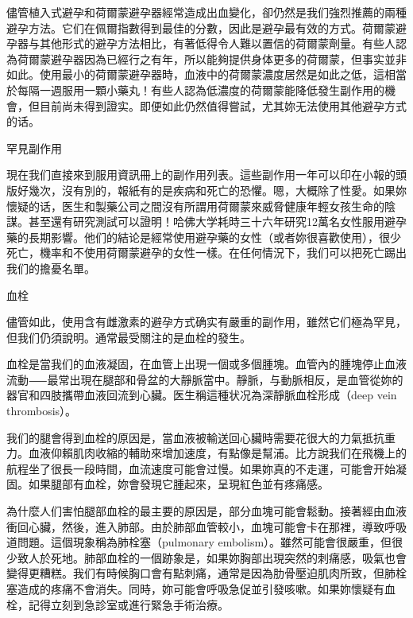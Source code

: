 \documentclass[12pt,UTF8]{ctexbook}
\begin{document}
儘管植入式避孕和荷爾蒙避孕器經常造成出血變化，卻仍然是我们強烈推薦的兩種避孕方法。它们在佩爾指數得到最佳的分數，因此是避孕最有效的方式。荷爾蒙避孕器与其他形式的避孕方法相比，有著低得令人難以置信的荷爾蒙劑量。有些人認為荷爾蒙避孕器因為已經行之有年，所以能夠提供身体更多的荷爾蒙，但事实並非如此。使用最小的荷爾蒙避孕器時，血液中的荷爾蒙濃度居然是如此之低，這相當於每隔一週服用一顆小藥丸！有些人認為低濃度的荷爾蒙能降低發生副作用的機會，但目前尚未得到證实。即便如此仍然值得嘗試，尤其妳无法使用其他避孕方式的话。





罕見副作用




現在我们直接來到服用資訊冊上的副作用列表。這些副作用一年可以印在小報的頭版好幾次，沒有別的，報紙有的是疾病和死亡的恐懼。嗯，大概除了性愛。如果妳懷疑的话，医生和製藥公司之間沒有所謂用荷爾蒙來威脅健康年輕女孩生命的陰謀。甚至還有研究測試可以證明！哈佛大学耗時三十六年研究12萬名女性服用避孕藥的長期影響。他们的結论是經常使用避孕藥的女性（或者妳很喜歡使用），很少死亡，機率和不使用荷爾蒙避孕的女性一樣。在任何情況下，我们可以把死亡踢出我们的擔憂名單。





血栓




儘管如此，使用含有雌激素的避孕方式确实有嚴重的副作用，雖然它们極為罕見，但我们仍須說明。通常最受關注的是血栓的發生。

血栓是當我们的血液凝固，在血管上出現一個或多個腫塊。血管內的腫塊停止血液流動⸺最常出現在腿部和骨盆的大靜脈當中。靜脈，与動脈相反，是血管從妳的器官和四肢攜帶血液回流到心臟。医生稱這種状况為深靜脈血栓形成（deep vein thrombosis）。

我们的腿會得到血栓的原因是，當血液被輸送回心臟時需要花很大的力氣抵抗重力。血液仰賴肌肉收縮的輔助來增加速度，有點像是幫浦。比方說我们在飛機上的航程坐了很長一段時間，血流速度可能會过慢。如果妳真的不走運，可能會开始凝固。如果腿部有血栓，妳會發現它腫起來，呈現紅色並有疼痛感。

為什麼人们害怕腿部血栓的最主要的原因是，部分血塊可能會鬆動。接著經由血液衝回心臟，然後，進入肺部。由於肺部血管較小，血塊可能會卡在那裡，導致呼吸道問題。這個現象稱為肺栓塞（pulmonary embolism）。雖然可能會很嚴重，但很少致人於死地。肺部血栓的一個跡象是，如果妳胸部出現突然的刺痛感，吸氣也會變得更糟糕。我们有時候胸口會有點刺痛，通常是因為肋骨壓迫肌肉所致，但肺栓塞造成的疼痛不會消失。同時，妳可能會呼吸急促並引發咳嗽。如果妳懷疑有血栓，記得立刻到急診室或進行緊急手術治療。
\end{document}
